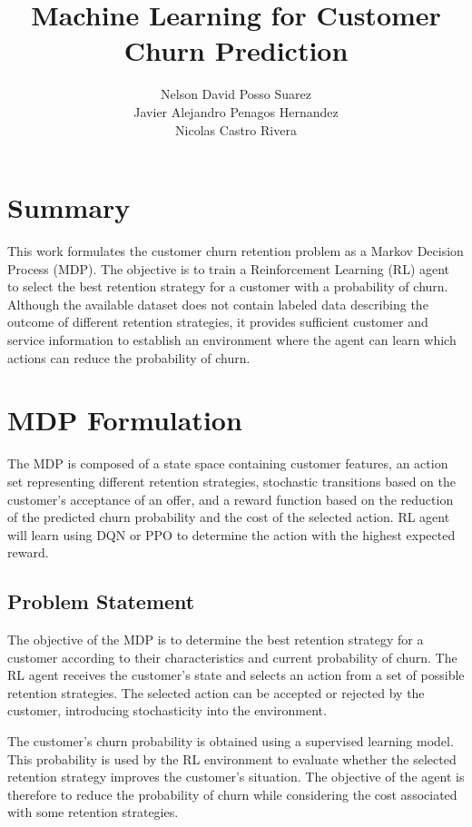 \documentclass{article}
\title{ Machine Learning for Customer Churn Prediction}
\author{Nelson David Posso Suarez \\ Javier Alejandro Penagos Hernandez \\ Nicolas Castro Rivera }
\date{}
\begin{document}
\maketitle

\section{Summary}

This work formulates the customer churn retention problem as a Markov Decision Process (MDP).
The objective is to train a Reinforcement Learning (RL) agent to select the best retention strategy
for a customer with a probability of churn. Although the available dataset does not contain labeled
data describing the outcome of different retention strategies, it provides sufficient customer and
service information to establish an environment where the agent can learn which actions can reduce
the probability of churn.



\section{MDP Formulation}
The MDP is composed of a state space containing customer features, an action set representing
different retention strategies, stochastic transitions based on the customer's acceptance of an
offer, and a reward function based on the reduction of the predicted churn probability and the
cost of the selected action. RL agent will learn using DQN or PPO to determine the action with 
the highest expected reward. 

\subsection{Problem Statement}

The objective of the MDP is to determine the best retention strategy for a customer according to
their characteristics and current probability of churn. The RL agent receives the customer's state
and selects an action from a set of possible retention strategies. The selected action can be
accepted or rejected by the customer, introducing stochasticity into the environment.

The customer's churn probability is obtained using a supervised learning model. This probability
is used by the RL environment to evaluate whether the selected retention strategy improves the
customer's situation. The objective of the agent is therefore to reduce the probability of churn
while considering the cost associated with some retention strategies.
\end{document}
